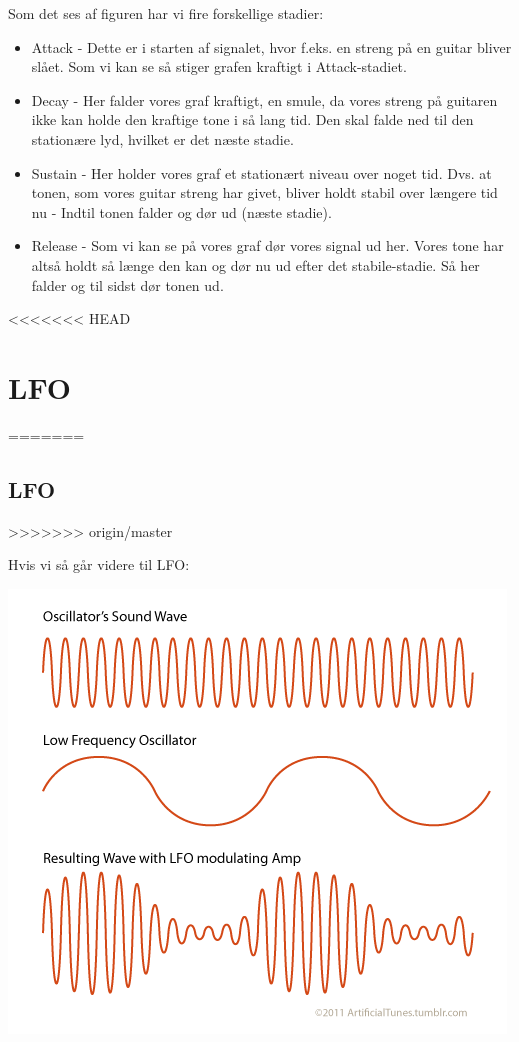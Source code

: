 \documentclass[12pt, letterpaper]{article}
\begin{document}
Som det ses af figuren har vi fire forskellige stadier: 
\begin{itemize}
\item Attack - Dette er i starten af signalet, hvor f.eks. en streng på en guitar bliver slået. Som vi kan se så stiger grafen kraftigt i Attack-stadiet. 
\item Decay - Her falder vores graf kraftigt, en smule, da vores streng på guitaren ikke kan holde den kraftige tone i så lang tid. Den skal falde ned til den stationære lyd, hvilket er det næste stadie.  
\item Sustain - Her holder vores graf et stationært niveau over noget tid. Dvs. at tonen, som vores guitar streng har givet, bliver holdt stabil over længere tid nu - Indtil tonen falder og dør ud (næste stadie). 
\item Release - Som vi kan se på vores graf dør vores signal ud her. Vores tone har altså holdt så længe den kan og dør nu ud efter det stabile-stadie. Så her falder og til sidst dør tonen ud. 
\end{itemize}

<<<<<<< HEAD
\section{LFO}
=======
\subsection{LFO}
>>>>>>> origin/master

Hvis vi så går videre til LFO: 

\begin{center}
\includegraphics[width=\textwidth]{billeder/LFO}
\end{center}
\end{document}
